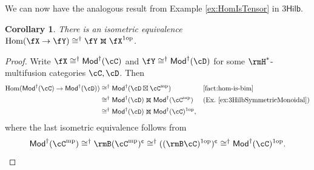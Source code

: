\documentclass[12pt, reqno]{amsart}
\DeclareMathOperator{\Hom}{Hom}
\newcommand{\op}{\mathrm{op}}
\renewcommand{\cent}{\textup{\textcent}}
\newcommand{\Mod}{\mathsf{Mod}}
\newcommand{\Hilb}{\mathsf{Hilb}}
\theoremstyle{plain}
\newtheorem{cor}[thm]{Corollary}
\theoremstyle{definition}
\newcommand{\dtimesaux}[4]{\mathbin{\vcenter{\hbox{\raisebox{#4}{\scalebox{#3}{\ooalign{\hfil$\vcenter{\hbox{$#1\times$}}$\hfil\cr\hfil$\vcenter{\hbox{\mbox{#2\upshape\wasylozenge}}}$\hfil\cr}}}}}}}
\newcommand{\dtimes}{%
  \mathchoice
    {\dtimesaux{\displaystyle}{\normalsize}{1.15}{0.35ex}}
    {\dtimesaux{\textstyle}{\normalsize}{1.15}{0.35ex}}
    {\dtimesaux{\scriptstyle}{\scriptsize}{1.0}{0ex}}
    {\dtimesaux{\scriptscriptstyle}{\tiny}{1.0}{0ex}}%
}
\newcommand{\threehilbtimes}{\dtimes}
\begin{document}
We can now have the analogous result from Example \ref{ex:HomIsTensor} in $3\Hilb$.

\begin{cor}
There is an isometric equivalence $\Hom(\fX \to \fY) \cong^\dag \fY\threehilbtimes \fX^{1\op}$.
\end{cor}
\begin{proof}
Write $\fX \cong^\dag \Mod^\dag(\cC)$ and $\fY \cong^\dag \Mod^\dag(\cD)$ for some $\rmH^*$-multifusion categories $\cC,\cD$.
Then
\begin{align*}
\Hom(\Mod^\dag(\cC)\to \Mod^\dag(\cD))
&\cong^\dag
\Mod^\dag(\cD\boxtimes \cC^{\rm mp})
&&\text{\ref{fact:hom-is-bim}}
\\&
\cong^\dag
\Mod^\dag(\cD)\threehilbtimes \Mod^\dag(\cC^{\rm mp})
&&\text{(Ex.~\ref{ex:3HilbSymmetricMonoidal})}
\\&
\cong^\dag
\Mod^\dag(\cD)\threehilbtimes \Mod^\dag(\cC)^{1\op},
&&
\end{align*}
where the last isometric equivalence follows from
\[
\Mod^\dag(\cC^{\rm mp}) 
\cong^\dag 
\rmB(\cC^{\rm mp})^\cent 
\cong^\dag
((\rmB\cC)^{1\op})^{\cent } 
\cong^\dag
\Mod^\dag(\cC)^{1 \op}.
\qedhere
\]
\end{proof}



{\footnotesize{

%
}}
\end{document}
